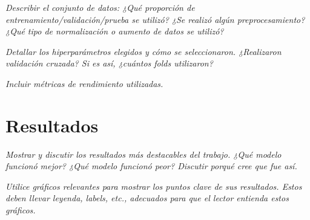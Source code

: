 \documentclass[11pt]{article}
\begin{document}
\textit{Describir el conjunto de datos: ¿Qué proporción de entrenamiento/validación/prueba se utilizó? ¿Se realizó algún preprocesamiento? ¿Qué tipo de normalización o aumento de datos se utilizó?}




\textit{Detallar los hiperparámetros elegidos y cómo se seleccionaron. ¿Realizaron validación cruzada? Si es así, ¿cuántos folds utilizaron?}

\textit{Incluir métricas de rendimiento utilizadas.}

\section{Resultados}
\textit{Mostrar y discutir los resultados más destacables del trabajo. ¿Qué modelo funcionó mejor? ¿Qué modelo funcionó peor? Discutir porqué cree que fue así.}

\textit{Utilice gráficos relevantes para mostrar los puntos clave de sus resultados. Estos deben llevar leyenda, labels, etc., adecuados para que el lector entienda estos gráficos.}
\end{document}
